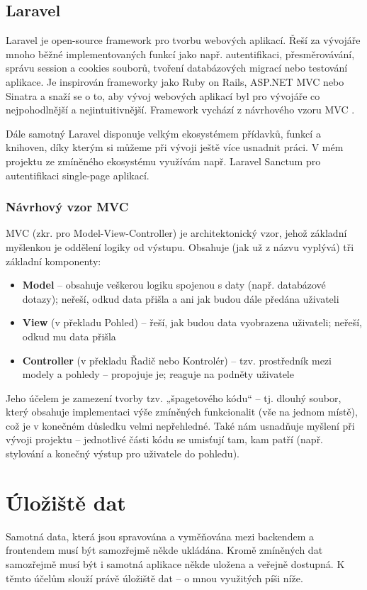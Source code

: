 	\subsection{Laravel}
	Laravel je open-source framework pro tvorbu webových aplikací. Řeší za vývojáře mnoho běžné implementovaných funkcí jako např. autentifikaci, přesměrovávání, správu session a cookies souborů, tvoření databázových migrací nebo testování aplikace. Je inspirován frameworky jako Ruby on Rails, ASP.NET MVC nebo Sinatra a snaží se o to, aby vývoj webových aplikací byl pro vývojáře co nejpohodlnější a nejintuitivnější. \cite{Laravel1} Framework vychází z návrhového vzoru MVC \cite{LaravelMVC}.
	
	Dále samotný Laravel disponuje velkým ekosystémem přídavků, funkcí a knihoven, díky kterým si můžeme při vývoji ještě více usnadnit práci. \cite{LaravelEco} V mém projektu ze zmíněného ekosystému využívám např. Laravel Sanctum pro autentifikaci single-page aplikací.
	
		\subsubsection{Návrhový vzor MVC}
		MVC (zkr. pro Model-View-Controller) je architektonický vzor, jehož základní myšlenkou je oddělení logiky od výstupu. Obsahuje (jak už z názvu vyplývá) tři základní komponenty:
		
		\begin{itemize}
			\item \textbf{Model} – obsahuje veškerou logiku spojenou s daty (např. databázové dotazy); neřeší, odkud data přišla a ani jak budou dále předána uživateli
			\item \textbf{View} (v překladu Pohled) – řeší, jak budou data vyobrazena uživateli; neřeší, odkud mu data přišla
			\item \textbf{Controller} (v překladu Řadič nebo Kontrolér) – tzv. prostředník mezi modely a pohledy – propojuje je; reaguje na podněty uživatele
		\end{itemize}
	
		Jeho účelem je zamezení tvorby tzv. „špagetového kódu“ – tj. dlouhý soubor, který obsahuje implementaci výše zmíněných funkcionalit (vše na jednom místě), což je v konečném důsledku velmi nepřehledné. Také nám usnadňuje myšlení při vývoji projektu – jednotlivé části kódu se umisťují tam, kam patří (např. stylování a konečný výstup pro uživatele do pohledu). \cite{MVC}
		
\section{Úložiště dat}
Samotná data, která jsou spravována a vyměňována mezi backendem a frontendem musí být samozřejmě někde ukládána. Kromě zmíněných dat samozřejmě musí být i samotná aplikace někde uložena a veřejně dostupná. K těmto účelům slouží právě úložiště dat – o mnou využitých píši níže.

